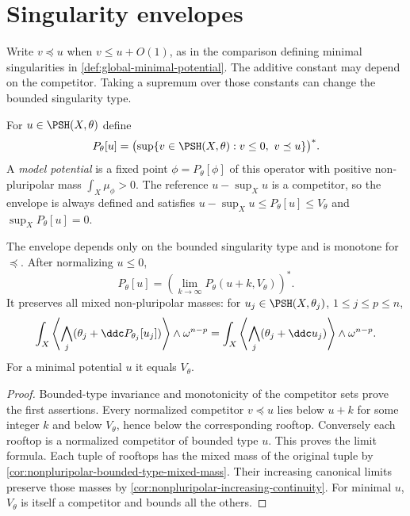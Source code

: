 





\section{Singularity envelopes}
\label{sec:singularity-envelopes}
Write $v\preceq u$ when $v\leq u+O(1)$, as in the comparison defining minimal singularities in \cref{def:global-minimal-potential}. The additive constant may depend on the competitor. Taking a supremum over those constants can change the bounded singularity type.

\begin{definition}\label{def:singularity-p-envelope}
For $u\in\PSH(X,\theta)$ define
\[
 P_\theta[u]=\bigl(\sup\{v\in\PSH(X,\theta):v\leq0,
                                                   \ v\preceq u\}\bigr)^*.
\]
A \emph{model potential} is a fixed point $\phi=P_\theta[\phi]$ of this operator with positive non-pluripolar mass $\int_X\mu_\phi>0$. The reference $u-\sup_Xu$ is a competitor, so the envelope is always defined and satisfies $u-\sup_Xu\leq P_\theta[u]\leq V_\theta$ and $\sup_XP_\theta[u]=0$.
\end{definition}

\begin{proposition}\label{prop:p-envelope-calculus}
The envelope depends only on the bounded singularity type and is monotone for $\preceq$. After normalizing $u\leq0$,
\[
 P_\theta[u]=\left(\lim_{k\to\infty}
                         P_\theta(u+k,V_\theta)\right)^*.
\]
It preserves all mixed non-pluripolar masses: for $u_j\in\PSH(X,\theta_j)$, $1\leq j\leq p\leq n$,
\[
 \int_X\left\langle\bigwedge_j(\theta_j+\ddc P_{\theta_j}[u_j])\right\rangle
                                      \wedge\omega^{n-p}
 =\int_X\left\langle\bigwedge_j(\theta_j+\ddc u_j)\right\rangle
                                      \wedge\omega^{n-p}.
\]
For a minimal potential $u$ it equals $V_\theta$.
\end{proposition}
\begin{proof}
Bounded-type invariance and monotonicity of the competitor sets prove the first assertions. Every normalized competitor $v\preceq u$ lies below $u+k$ for some integer $k$ and below $V_\theta$, hence below the corresponding rooftop. Conversely each rooftop is a normalized competitor of bounded type $u$. This proves the limit formula. Each tuple of rooftops has the mixed mass of the original tuple by \cref{cor:nonpluripolar-bounded-type-mixed-mass}. Their increasing canonical limits preserve those masses by \cref{cor:nonpluripolar-increasing-continuity}. For minimal $u$, $V_\theta$ is itself a competitor and bounds all the others.
\end{proof}

